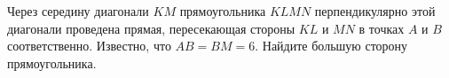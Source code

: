 \begin{ex}
	\begin{condition}
		Через середину диагонали \( KM  \) прямоугольника \( KLMN  \) перпендикулярно этой диагонали проведена прямая, пересекающая стороны \( KL  \) и \( MN  \) в точках \( A  \) и \( B  \) соответственно. Известно, что \( AB = BM = 6  \). Найдите большую сторону прямоугольника.
	\end{condition}
\end{ex}